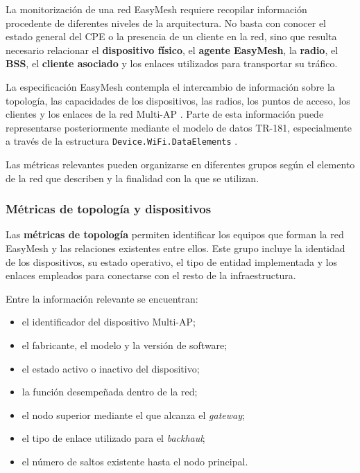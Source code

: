 La monitorización de una red EasyMesh requiere recopilar información
procedente de diferentes niveles de la arquitectura. No basta con conocer
el estado general del CPE o la presencia de un cliente en la red, sino que
resulta necesario relacionar el \textbf{dispositivo físico}, el
\textbf{agente EasyMesh}, la \textbf{radio}, el
\textbf{BSS}, el \textbf{cliente asociado} y los enlaces utilizados para
transportar su tráfico.

La especificación EasyMesh contempla el intercambio de información sobre
la topología, las capacidades de los dispositivos, las radios, los
puntos de acceso, los clientes y los enlaces de la red Multi-AP
\cite{wifi_alliance_easymesh}. Parte de esta información puede
representarse posteriormente mediante el modelo de datos TR-181,
especialmente a través de la estructura
\texttt{Device.WiFi.DataElements}
\cite{bbf_tr181}.

Las métricas relevantes pueden organizarse en diferentes grupos según el
elemento de la red que describen y la finalidad con la que se utilizan.

\subsubsection*{Métricas de topología y dispositivos}

Las \textbf{métricas de topología} permiten identificar los equipos que
forman la red EasyMesh y las relaciones existentes entre ellos. Este
grupo incluye la identidad de los dispositivos, su estado operativo, el
tipo de entidad implementada y los enlaces empleados para conectarse con
el resto de la infraestructura.

Entre la información relevante se encuentran:

\begin{itemize}
    \item el identificador del dispositivo Multi-AP;
    \item el fabricante, el modelo y la versión de software;
    \item el estado activo o inactivo del dispositivo;
    \item la función desempeñada dentro de la red;
    \item el nodo superior mediante el que alcanza el
    \textit{gateway};
    \item el tipo de enlace utilizado para el \textit{backhaul};
    \item el número de saltos existente hasta el nodo principal.
\end{itemize}

